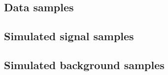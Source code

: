 \subsection{Data samples} \label{sec:Data}


\subsection{Simulated signal samples} \label{sec:SimSignal}


\subsection{Simulated background samples} \label{sec:SimBackground}
